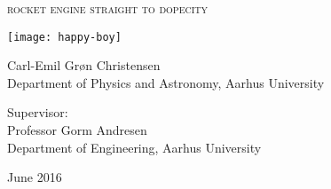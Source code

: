 
\begin{titlingpage}

\begin{center}

\vspace*{0cm}
\huge
\textsc{rocket engine straight to dopecity}\\
\vspace{1.5cm}

\texttt{[image: happy-boy]}

\vspace{1.5cm}

\large
{
    Carl-Emil Grøn Christensen\\
    Department of Physics and Astronomy, Aarhus University
}

\vspace{1.5cm}

{
  Supervisor:\\
  Professor Gorm Andresen\\
  Department of Engineering, Aarhus University
}

\vspace{1.5cm}
{June 2016}\\


\end{center}



\end{titlingpage}
